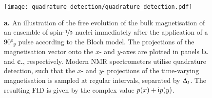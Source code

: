 \begin{figure}
    \centering
    \texttt{[image: quadrature\_detection/quadrature\_detection.pdf]}
    \caption[
        An illustration of the free evolution of the bulk
        magnetisation of an ensemble of spin-$\nicefrac{1}{2}$ nuclei
        according to the Bloch model.
    ]{
        \textbf{a.} An illustration of the free evolution of the bulk
        magnetisation of an ensemble of spin-$\nicefrac{1}{2}$ nuclei
        immediately after the application of a $\ang{90}_y$ pulse according to
        the Bloch model.
        The projections of the magnetisation vector onto the
        $x$- and  $y$-axes are plotted in panels \textbf{b.} and \textbf{c.},
        respectively. Modern \acs{NMR} spectrometers utilise quadrature
        detection, such that the $x$- and  $y$- projections of the time-varying
        magnetisation is sampled at regular intervals, separated by $\Updelta_t$.
        The resulting \acs{FID} is given by the complex value $p(x) + \mathrm{i}
        p(y)$.
    }\label{fig:quadrature}
\end{figure}

